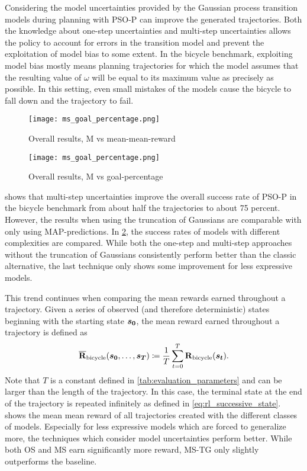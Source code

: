 Considering the model uncertainties provided by the Gaussian process transition models during planning with PSO-P can improve the generated trajectories.
Both the knowledge about one-step uncertainties and multi-step uncertainties allows the policy to account for errors in the transition model and prevent the exploitation of model bias to some extent.
In the bicycle benchmark, exploiting model bias mostly means planning trajectories for which the model assumes that the resulting value of $\omega$ will be equal to its maximum value as precisely as possible.
In this setting, even small mistakes of the models cause the bicycle to fall down and the trajectory to fail.

\begin{figure}[tp]
    \centering
    \texttt{[image: ms\_goal\_percentage.png]}
    \caption{Overall results, M vs mean-mean-reward}
    \label{fig:results_mean_mean_reward}
\end{figure}
\begin{figure}[tp]
    \centering
    \texttt{[image: ms\_goal\_percentage.png]}
    \caption{Overall results, M vs goal-percentage}
    \label{fig:results_goal_percentage}
\end{figure}
 shows that multi-step uncertainties improve the overall success rate of PSO-P in the bicycle benchmark from about half the trajectories to about 75 percent.
However, the results when using the truncation of Gaussians are comparable with only using MAP-predictions.
In \cref{fig:results_goal_percentage}, the success rates of models with different complexities are compared.
While both the one-step and multi-step approaches without the truncation of Gaussians consistently perform better than the classic alternative, the last technique only shows some improvement for less expressive models.

This trend continues when comparing the mean rewards earned throughout a trajectory.
Given a series of observed (and therefore deterministic) states beginning with the starting state $\bm{s_0}$, the mean reward earned throughout a trajectory is defined as
\begin{align}
    \operatorname{\overline{\operatorname{\mathbf{R}}}_{\text{bicycle}}}(\bm{s_0}, \dots, \bm{s_T}) \coloneqq \frac{1}{T} \sum_{t=0}^T \operatorname{\operatorname{\mathbf{R}}_{\text{bicycle}}}(\bm{s_t}).
\end{align}
Note that $T$ is a constant defined in \cref{tab:evaluation_parameters} and can be larger than the length of the trajectory.
In this case, the terminal state at the end of the trajectory is repeated infinitely as defined in \cref{eq:rl_successive_state}.
 shows the mean mean reward of all trajectories created with the different classes of models.
Especially for less expressive models which are forced to generalize more, the techniques which consider model uncertainties perform better.
While both OS and MS earn significantly more reward, MS-TG only slightly outperforms the baseline.

